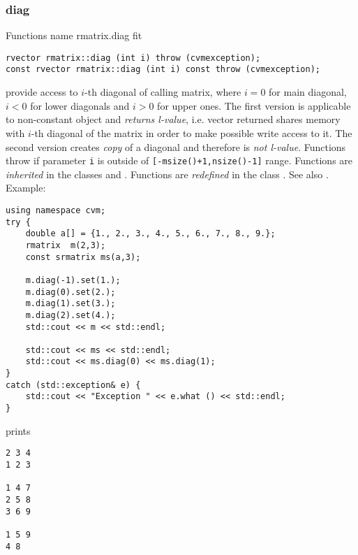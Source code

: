 \subsubsection{diag}
Functions%
\pdfdest name {rmatrix.diag} fit
\begin{verbatim}
rvector rmatrix::diag (int i) throw (cvmexception);
const rvector rmatrix::diag (int i) const throw (cvmexception);
\end{verbatim}
provide access to  \hbox{$i$-th} diagonal of calling matrix,
where $i=0$ for main diagonal, $i<0$ for lower diagonals
and $i>0$ for upper ones.
The first version
is applicable to  non-constant object and
\emph{returns  l-value}, i.e. vector returned shares  memory
with  \hbox{$i$-th} diagonal of the matrix
in order to make possible write access to it.
The second version creates  \emph{copy} of a diagonal and therefore is
\emph{not  l-value}.
Functions throw 
if  parameter \verb"i" is outside of
\verb"[-msize()+1,nsize()-1]" range.
Functions are \emph{inherited}
in  the classes
 and .
Functions are \emph{redefined}
in  the class .
See also .
Example:
\begin{Verbatim}
using namespace cvm;
try {
    double a[] = {1., 2., 3., 4., 5., 6., 7., 8., 9.};
    rmatrix  m(2,3);
    const srmatrix ms(a,3);

    m.diag(-1).set(1.);
    m.diag(0).set(2.);
    m.diag(1).set(3.);
    m.diag(2).set(4.);
    std::cout << m << std::endl;

    std::cout << ms << std::endl;
    std::cout << ms.diag(0) << ms.diag(1);
}
catch (std::exception& e) {
    std::cout << "Exception " << e.what () << std::endl;
}
\end{Verbatim}
prints
\begin{Verbatim}
2 3 4
1 2 3

1 4 7
2 5 8
3 6 9

1 5 9
4 8
\end{Verbatim}
\newpage





